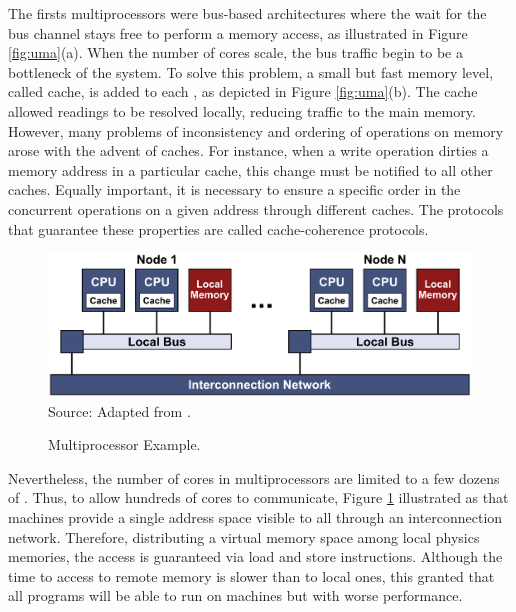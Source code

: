 			The firsts \uma multiprocessors were bus-based architectures where
			the \cpu wait for the bus channel stays free to perform a memory
			access, as illustrated in Figure \ref{fig:uma}(a).
			When the number of cores scale, the bus traffic begin to be a
			bottleneck of the system.
			To solve this problem, a small but fast memory level, called cache,
			is added to each \cpu, as depicted in Figure \ref{fig:uma}(b).
			The cache allowed readings to be resolved locally, reducing traffic
			to the main memory.
			However, many problems of inconsistency and ordering of operations
			on memory arose with the advent of caches.
			For instance, when a write operation dirties a memory address in
			a particular cache, this change must be notified to all other caches.
			Equally important, it is necessary to ensure a specific order in
			the concurrent operations on a given address through different caches.
			The protocols that guarantee these properties are called cache-coherence protocols.

			\begin{figure}[t]
				\centering
				\caption{\numa Multiprocessor Example.}

				\includegraphics[width=.8\textwidth]{images/numa.pdf} \\ \vspace{0.3cm}
				Source: Adapted from \cite{tanenbaum:4ed}.

				\label{fig.numa}
			\end{figure}

			Nevertheless, the number of cores in \uma multiprocessors are limited
			to a few dozens of \cpus.
			Thus, to allow hundreds of cores to communicate, Figure \ref{fig.numa} illustrated
			as that \numa machines provide a single address space visible to all \cpus
			through an interconnection network.
			Therefore, distributing a virtual memory space among local physics memories,
			the access is guaranteed via load and store instructions.
			Although the time to access to remote memory is slower than to local ones,
			this granted that all \uma programs will be able to run on \numa machines
			but with worse performance.

